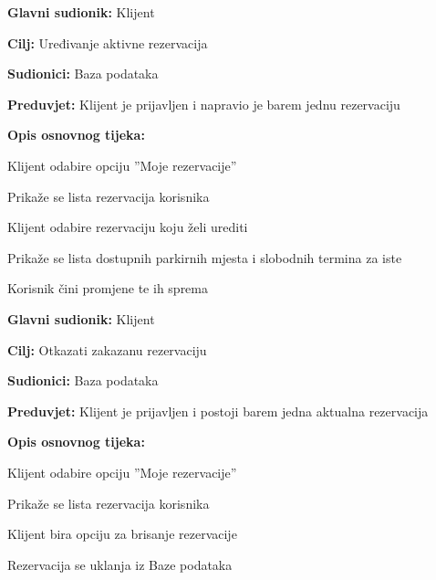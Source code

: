                         \noindent {}
					\begin{packed_item}
	
						\item \textbf{Glavni sudionik: }Klijent
						\item  \textbf{Cilj:} Uređivanje aktivne rezervacija
						\item  \textbf{Sudionici:} Baza podataka
						\item  \textbf{Preduvjet:} Klijent je prijavljen i napravio je barem jednu rezervaciju
						\item  \textbf{Opis osnovnog tijeka:}
						
						\item[] \begin{packed_enum}
	
							\item Klijent odabire opciju ”Moje rezervacije”
							\item Prikaže se lista rezervacija korisnika
							\item Klijent odabire rezervaciju koju želi urediti
                                \item Prikaže se lista dostupnih parkirnih mjesta i slobodnih termina za iste
                                \item Korisnik čini promjene te ih sprema
							
						\end{packed_enum}
					\end{packed_item}

                        \noindent {}
					\begin{packed_item}
	
						\item \textbf{Glavni sudionik: }Klijent
						\item  \textbf{Cilj:} Otkazati zakazanu rezervaciju
						\item  \textbf{Sudionici:} Baza podataka
						\item  \textbf{Preduvjet:} Klijent je prijavljen i postoji barem jedna aktualna rezervacija
						\item  \textbf{Opis osnovnog tijeka:}
						
						\item[] \begin{packed_enum}
	
							\item Klijent odabire opciju ”Moje rezervacije”
							\item Prikaže se lista rezervacija korisnika
							\item Klijent bira opciju za brisanje rezervacije
                                \item Rezervacija se uklanja iz Baze podataka
							
						\end{packed_enum}
					\end{packed_item}

